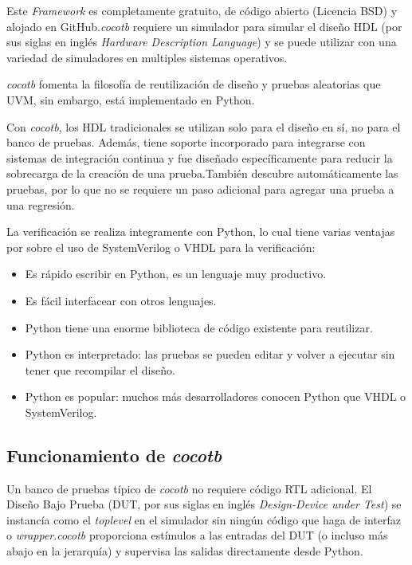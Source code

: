 Este \textit{Framework} es completamente gratuito, de código abierto (Licencia
BSD) y alojado en GitHub.\textit{cocotb} requiere un simulador para simular el
diseño HDL (por sus siglas en inglés \textit{Hardware Description Language}) y
se puede utilizar con una variedad de simuladores en multiples sistemas
operativos.

\textit{cocotb} fomenta la filosofía de reutilización de diseño y pruebas
aleatorias que UVM, sin embargo, está implementado en Python.

Con \textit{cocotb}, los HDL tradicionales se utilizan solo para el diseño en
sí, no para el banco de pruebas. Además, tiene soporte incorporado para
integrarse con sistemas de integración continua y fue diseñado específicamente
para reducir la sobrecarga de la creación de una prueba.También descubre
automáticamente las pruebas, por lo que no se requiere un paso adicional para
agregar una prueba a una regresión.

La verificación se realiza integramente con Python, lo cual tiene varias
ventajas por sobre el uso de SystemVerilog o VHDL para la verificación:

\begin{itemize}
  \item Es rápido escribir en Python, es un lenguaje muy productivo.
  \item Es fácil interfacear con otros lenguajes.
  \item Python tiene una enorme biblioteca de código existente para reutilizar.
  \item Python es interpretado: las pruebas se pueden editar y volver a ejecutar
  sin tener que recompilar el diseño.
  \item Python es popular: muchos más desarrolladores conocen Python que
  VHDL o SystemVerilog.
\end{itemize}

\subsection{Funcionamiento de \textit{cocotb}}

Un banco de pruebas típico de \textit{cocotb} no requiere código RTL adicional.
El Diseño Bajo Prueba (DUT, por sus siglas en inglés \textit{Design-Device
under Test}) se instancía como el \textit{toplevel} en el simulador sin ningún
código que haga de interfaz o \textit{wrapper}.\textit{cocotb} proporciona
estímulos a las entradas del DUT (o incluso más abajo en la jerarquía) y
supervisa las salidas directamente desde Python.

